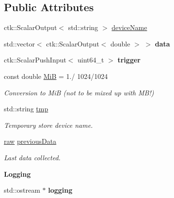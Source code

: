 \subsection*{Public Attributes}
\begin{DoxyCompactItemize}
\item 
ctk\+::\+Scalar\+Output$<$ std\+::string $>$ \hyperlink{structNetworkModule_a905ba8feb33486a15d2b79bec4e55b17}{device\+Name}
\item 
std\+::vector$<$ ctk\+::\+Scalar\+Output$<$ double $>$ $>$ {\bfseries data}\hypertarget{structNetworkModule_a84df4697c4fcc51dded4e012907ad335}{}\label{structNetworkModule_a84df4697c4fcc51dded4e012907ad335}

\item 
ctk\+::\+Scalar\+Push\+Input$<$ uint64\+\_\+t $>$ {\bfseries trigger}
\item 
const double \hyperlink{structNetworkModule_aa5d927cfc7700ec4c6e50637feaf2635}{MiB} = 1./ 1024/1024\hypertarget{structNetworkModule_aa5d927cfc7700ec4c6e50637feaf2635}{}\label{structNetworkModule_aa5d927cfc7700ec4c6e50637feaf2635}

\begin{DoxyCompactList}\small\item\em Conversion to MiB (not to be mixed up with M\+B!) \end{DoxyCompactList}\item 
std\+::string \hyperlink{structNetworkModule_a30dba9243a399a5183f836414d012b3f}{tmp}\hypertarget{structNetworkModule_a30dba9243a399a5183f836414d012b3f}{}\label{structNetworkModule_a30dba9243a399a5183f836414d012b3f}

\begin{DoxyCompactList}\small\item\em Temporary store device name. \end{DoxyCompactList}\item 
\hyperlink{structNetworkModule_1_1raw}{raw} \hyperlink{structNetworkModule_a66af7484e4c3258162a689820f864280}{previous\+Data}\hypertarget{structNetworkModule_a66af7484e4c3258162a689820f864280}{}\label{structNetworkModule_a66af7484e4c3258162a689820f864280}

\begin{DoxyCompactList}\small\item\em Last data collected. \end{DoxyCompactList}\end{DoxyCompactItemize}
\begin{Indent}{\bf Logging}\par
\begin{DoxyCompactItemize}
\item 
std\+::ostream $\ast$ {\bfseries logging}\hypertarget{structNetworkModule_a7109968c966a84f59eb93e0922e8f6dc}{}\label{structNetworkModule_a7109968c966a84f59eb93e0922e8f6dc}

\end{DoxyCompactItemize}
\end{Indent}



